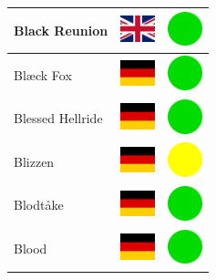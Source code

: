 \documentclass[12pt, a4paper, twoside]{report}
\begin{document}
\begin{center}
\begin{longtable}{|p{5cm}|p{2cm}|p{2cm}|}
 Black Reunion                                              & \includegraphics[width=1cm]{4x3/gb} &   \includegraphics[width=1cm]{likes/y} \\ \hline
 Blæck Fox                                                  & \includegraphics[width=1cm]{4x3/de} &   \includegraphics[width=1cm]{likes/y} \\ \hline
 Blessed Hellride                                           & \includegraphics[width=1cm]{4x3/de} &   \includegraphics[width=1cm]{likes/y} \\ \hline
 Blizzen                                                    & \includegraphics[width=1cm]{4x3/de} &   \includegraphics[width=1cm]{likes/m} \\ \hline
 Blodtåke                                                   & \includegraphics[width=1cm]{4x3/de} &   \includegraphics[width=1cm]{likes/y} \\ \hline
 Blood                                                      & \includegraphics[width=1cm]{4x3/de} &   \includegraphics[width=1cm]{likes/y} \\ \hline

\end{longtable}
\end{center}
\end{document}
